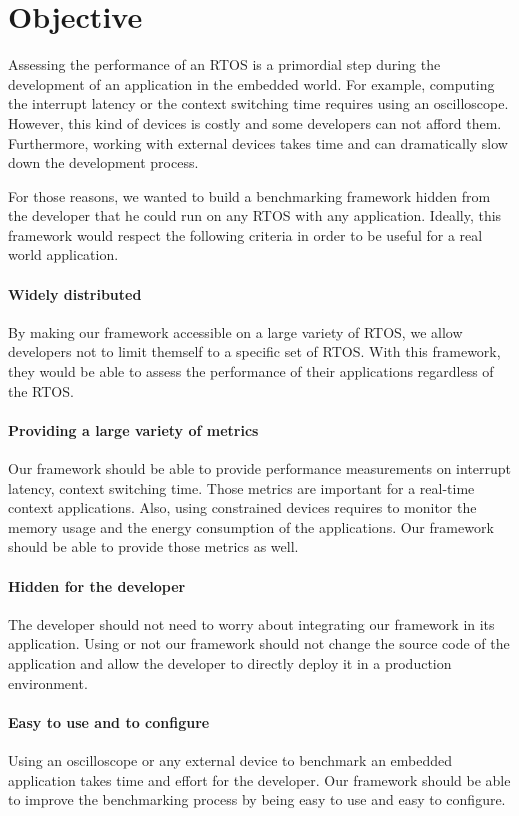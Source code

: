 \section{Objective}

Assessing the performance of an RTOS is a primordial step during the development of an application in the embedded world.
For example, computing the interrupt latency or the context switching time requires using an oscilloscope.
However, this kind of devices is costly and some developers can not afford them.
Furthermore, working with external devices takes time and can dramatically slow down the development process.

For those reasons, we wanted to build a benchmarking framework hidden from the developer that he could run on any RTOS with any application.
Ideally, this framework would respect the following criteria in order to be useful for a real world application.

\paragraph{Widely distributed}
By making our framework accessible on a large variety of RTOS, we allow developers not to limit themself to a specific set of RTOS.
With this framework, they would be able to assess the performance of their applications regardless of the RTOS.

\paragraph{Providing a large variety of metrics}
Our framework should be able to provide performance measurements on interrupt latency, context switching time.
Those metrics are important for a real-time context applications.
Also, using constrained devices requires to monitor the memory usage and the energy consumption of the applications.
Our framework should be able to provide those metrics as well.

\paragraph{Hidden for the developer}
The developer should not need to worry about integrating our framework in its application.
Using or not our framework should not change the source code of the application and allow the developer to directly deploy it in a production environment.

\paragraph{Easy to use and to configure}
Using an oscilloscope or any external device to benchmark an embedded application takes time and effort for the developer.
Our framework should be able to improve the benchmarking process by being easy to use and easy to configure.

